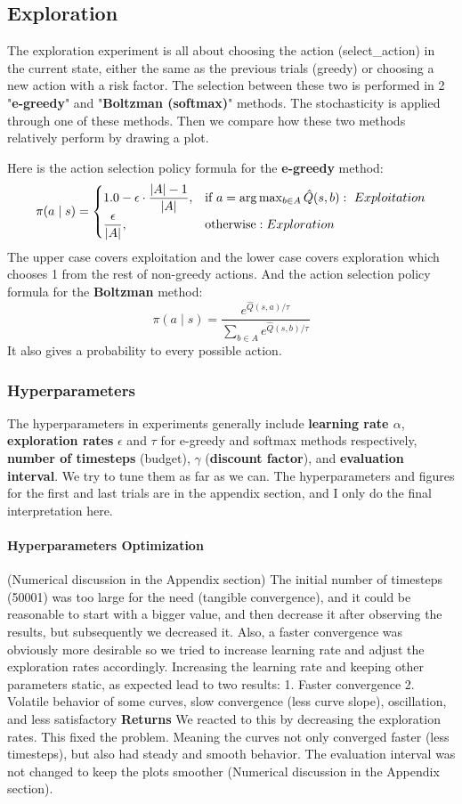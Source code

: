 \documentclass{article}
\theoremstyle{plain}
\theoremstyle{definition}
\theoremstyle{remark}
\begin{document}
\subsection{Exploration}\label{subsec:exploration}
The exploration experiment is all about choosing the action (select\_action) in the current state, either the same as the previous trials (greedy) or choosing a new action with a risk factor. The selection between these two is performed in 2 "\textbf{e-greedy}" and "\textbf{Boltzman (softmax)}" methods. The stochasticity is applied through one of these methods. Then we compare how these two methods relatively perform by drawing a plot. 


Here is the action selection policy formula for the \textbf{e-greedy} method:
\[
\pi(a \mid s)=
\begin{cases}
1.0 - \epsilon \cdot \dfrac{|A|-1}{|A|}, 
& \text{if } a=\arg\max_{b\in A}\hat{Q}(s,b):\space\ Exploitation \\[6pt]
\dfrac{\epsilon}{|A|}, 
& \text{otherwise}:\space\space\space Exploration
\end{cases}
\]
The upper case covers exploitation and the lower case covers exploration which chooses 1 from the rest of non-greedy actions. And the action selection policy formula for the \textbf{Boltzman} method:
\[
\pi(a \mid s)=
\frac{e^{\hat{Q}(s,a)/\tau}}
{\sum_{b\in A} e^{\hat{Q}(s,b)/\tau}}
\]
 It also gives a probability to every possible action.
 

\subsubsection{Hyperparameters}
The hyperparameters in experiments generally include \textbf{learning rate $\alpha$}, \textbf{exploration rates} $\epsilon$ and $\tau$ for e-greedy and softmax methods respectively, \textbf{number of timesteps} (budget), $\gamma$ (\textbf{discount factor}), and \textbf{evaluation interval}. We try to tune them as far as we can. The hyperparameters and figures for the first and last trials are in the appendix section, and I only do the final interpretation here.
\paragraph{Hyperparameters Optimization} (Numerical discussion in the Appendix section)
The initial number of timesteps (50001) was too large for the need (tangible convergence), and it could be reasonable to start with a bigger value, and then decrease it after observing the results, but subsequently we decreased it. Also, a faster convergence was obviously more desirable so we tried to increase learning rate and adjust the exploration rates accordingly. Increasing the learning rate and keeping other parameters static, as expected lead to two results:
1. Faster convergence
2. Volatile behavior of some curves, slow convergence (less curve slope), oscillation, and less satisfactory \textbf{Returns}
We reacted to this by decreasing the exploration rates. This fixed the  problem. Meaning the curves not only converged faster (less timesteps), but also had steady and smooth behavior. The evaluation interval was not changed to keep the plots smoother (Numerical discussion in the Appendix section).
\end{document}
